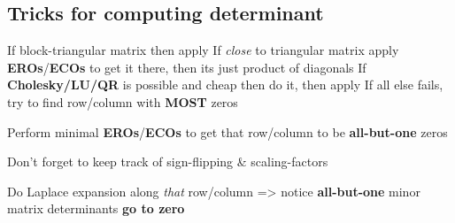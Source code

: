 \begin{itemize}
\begin{itemize}
                  \vItem
                  \vItem
                  \vItem
            \end{itemize}
\end{itemize}

\subsection*{Tricks for computing
      determinant}

\begin{itemize}

      \vItem
            If block-triangular matrix then apply
      \vItem
            If \emph{close} to triangular matrix apply \textbf{EROs}/\textbf{ECOs}
            to get it there, then its just product of diagonals
      \vItem
            If \textbf{Cholesky/LU/QR} is possible and cheap then do it, then
            apply 
            \tcbbreak
      \vItem
            If all else fails, try to find row/column with \textbf{MOST} zeros

            \begin{itemize}

                  \vItem
                        Perform minimal \textbf{EROs}/\textbf{ECOs} to get that row/column
                        to be \textbf{all-but-one} zeros

                        \begin{itemize}

                              \vItem
                                    Don't forget to keep track of sign-flipping \& scaling-factors
                        \end{itemize}
                  \vItem
                        Do Laplace expansion along \emph{that} row/column =>
                        notice \textbf{all-but-one} minor matrix determinants \textbf{go to
                              zero}
            \end{itemize}
\end{itemize}

